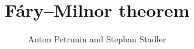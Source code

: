 \documentclass[twoside]{article}
\begin{document}
\title{F\'ary--Milnor theorem}
\author{Anton Petrunin and Stephan Stadler}

\date{}
\maketitle





%






\sloppy
\printbibliography[heading=bibintoc]
\fussy
\end{document}
